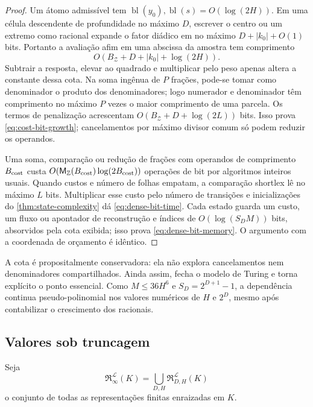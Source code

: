 \documentclass[11pt,a4paper]{article}
\theoremstyle{definition}
\theoremstyle{remark}
\newcommand{\Library}{\mathcal{L}}
\newcommand{\Representations}{\mathfrak{R}}
\begin{document}
\begin{proof}
Um átomo admissível tem $\operatorname{bl}(y_0),
\operatorname{bl}(s)=O(\log(2H))$. Em uma célula descendente de profundidade
no máximo $D$, escrever o centro ou um extremo como racional expande o fator
diádico em no máximo $D+|k_0|+O(1)$ bits. Portanto a avaliação afim em uma
abscissa da amostra tem comprimento
\[
 O(B_{\mathcal Z}+D+|k_0|+\log(2H)).
\]
Subtrair a resposta, elevar ao quadrado e multiplicar pelo peso apenas altera
a constante dessa cota. Na soma ingênua de $P$ frações, pode-se tomar como
denominador o produto dos denominadores; logo numerador e denominador têm
comprimento no máximo $P$ vezes o maior comprimento de uma parcela. Os termos
de penalização acrescentam $O(B_{\mathcal Z}+D+\log(2L))$ bits. Isso prova
\eqref{eq:cost-bit-growth}; cancelamentos por máximo divisor comum só podem
reduzir os operandos.

Uma soma, comparação ou redução de frações com operandos de comprimento
$B_{\rm cost}$ custa
$O(\mathsf M_{\mathbb Z}(B_{\rm cost})\log(2B_{\rm cost}))$ operações de bit
por algoritmos inteiros usuais. Quando custos e número de folhas empatam, a
comparação shortlex lê no máximo $L$ bits. Multiplicar esse custo pelo número
de transições e inicializações do \cref{thm:state-complexity} dá
\eqref{eq:dense-bit-time}. Cada estado guarda um custo, um fluxo ou apontador
de reconstrução e índices de $O(\log(S_DM))$ bits, absorvidos pela cota exibida;
isso prova \eqref{eq:dense-bit-memory}. O argumento com a coordenada de
orçamento é idêntico.
\end{proof}

A cota é propositalmente conservadora: ela não explora cancelamentos nem
denominadores compartilhados. Ainda assim, fecha o modelo de Turing e torna
explícito o ponto essencial. Como $M\le36H^6$ e $S_D=2^{D+1}-1$, a
dependência continua pseudo-polinomial nos valores numéricos de $H$ e $2^D$,
mesmo após contabilizar o crescimento dos racionais.

\subsection{Valores sob truncagem}

Seja
\[
 \Representations_{\infty}^{\Library}(K)
 =\bigcup_{D,H}\Representations_{D,H}^{\Library}(K)
\]
o conjunto de todas as representações finitas enraizadas em $K$.
\end{document}
